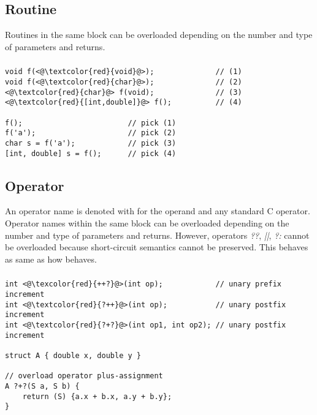\subsection{Routine}
Routines in the same block can be overloaded depending on the number and type of
parameters and returns.
\begin{frame}
\frametitle{}
\begin{lstlisting}
void f(<@\textcolor{red}{void}@>);              // (1)
void f(<@\textcolor{red}{char}@>);              // (2)
<@\textcolor{red}{char}@> f(void);              // (3)
<@\textcolor{red}{[int,double]}@> f();          // (4)

f();                        // pick (1)
f('a');                     // pick (2)
char s = f('a');            // pick (3)
[int, double] s = f();      // pick (4)
\end{lstlisting}
\end{frame}

\subsection{Operator}
An operator name is denoted with \? for the operand and any standard C
operator. Operator names within the same block can be overloaded depending on
the number and type of parameters and returns. However, operators \textit{??},
\textit{||}, \textit{?:} cannot be overloaded because short-circuit semantics
cannot be preserved. This behaves as same as how \CCS behaves.
\begin{frame}
\frametitle{}
\begin{lstlisting}
int <@\texcolor{red}{++?}@>(int op);            // unary prefix increment
int <@\textcolor{red}{?++}@>(int op);           // unary postfix increment
int <@\textcolor{red}{?+?}@>(int op1, int op2); // unary postfix increment

struct A { double x, double y }

// overload operator plus-assignment
A ?+?(S a, S b) {
    return (S) {a.x + b.x, a.y + b.y};
}
\end{lstlisting}
\end{frame}
